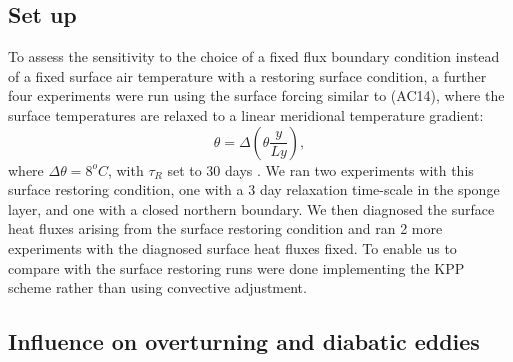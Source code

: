 \subsection{Set up}
To assess the sensitivity to the choice of a fixed flux boundary condition instead of a fixed surface air temperature with a restoring surface condition, a further four experiments were run using the surface forcing similar to \citet{Abernathey2014} (AC14), where the surface temperatures are relaxed to a linear meridional temperature gradient:
\begin{equation}
\theta = \Delta (\theta \frac{y}{Ly}),
\end{equation}
where $\Delta \theta  = 8^{o}C$, with $\tau _R$ set to 30 days \citep{Hanley1971}. We ran two experiments with this surface restoring condition, one with a 3 day relaxation time-scale in the sponge layer, and one with a closed northern boundary. We then diagnosed the surface heat fluxes arising from the surface restoring condition and ran 2 more experiments with the diagnosed surface heat fluxes fixed. To enable us to compare with \citet{Abernathey2014} the surface restoring runs were done implementing the KPP scheme rather than using convective adjustment. 

\subsection{Influence on overturning and diabatic eddies}

